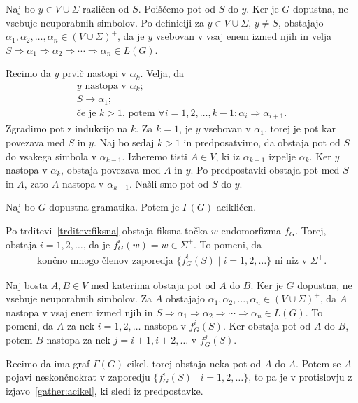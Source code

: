 \documentclass[fin1, tisk]{fmfdelo}
\theoremstyle{definition}
\begin{document}
\begin{dokaz}
    Naj bo $y \in V \cup \Sigma$ različen od $S$. Poiščemo pot od $S$ do $y$. Ker je $G$ dopustna,
    ne vsebuje neuporabnih simbolov. Po definiciji za $y \in V \cup \Sigma$, $ y \neq S$, obstajajo
    $\alpha_1, \alpha_2, \ldots, \alpha_n \in (V \cup \Sigma)^+$, da je $y$ vsebovan v vsaj
    enem izmed njih in velja $S \Rightarrow \alpha_1 \Rightarrow \alpha_2 \Rightarrow \cdots 
    \Rightarrow \alpha_n \in L(G)$.
    
    Recimo da $y$ prvič nastopi v $\alpha_k$. Velja, da
    \begin{gather*}
        y \text{ nastopa v } \alpha_k; \\
        S \rightarrow \alpha_1; \\
        \text{če je } k > 1 \text{, potem } \forall i = 1, 2, \ldots, k-1 \colon \alpha_i 
        \Rightarrow \alpha_{i+1}.
    \end{gather*}
    Zgradimo pot z indukcijo na $k$. Za $k=1$, je $y$ vsebovan v $\alpha_1$, torej je pot kar 
    povezava med $S$ in $y$. Naj bo sedaj $k>1$ in predposatvimo, da obstaja pot od $S$ do vsakega
    simbola v $\alpha_{k-1}$. Izberemo tisti $A \in V$, ki iz $\alpha_{k-1}$ izpelje $\alpha_k$.
    Ker $y$ nastopa v $\alpha_k$, obstaja povezava med $A$ in $y$. Po predpostavki obstaja pot
    med $S$ in $A$, zato $A$ nastopa v $\alpha_{k-1}$. Našli smo pot od $S$ do $y$.
\end{dokaz}

\begin{lema}\label{lema:acikličen}
    Naj bo $G$ dopustna gramatika. Potem je $\Gamma(G)$ acikličen.
\end{lema}

\begin{dokaz}
    Po trditevi~\ref{trditev:fiksna} obstaja fiksna točka $w$ endomorfizma $f_G$. Torej, obstaja
    $i = 1, 2, \ldots$, da je $f^i_G(w) = w \in \Sigma^+$. To pomeni, da 
    \begin{gather}\label{gather:acikel}
        \text{končno mnogo členov zaporedja } \{ f^i_G(S) \mid i = 1, 2, \ldots \} \text{ ni niz v }
        \Sigma^+.
    \end{gather}
    
    Naj bosta $A, B \in V$ med katerima obstaja pot od $A$ do $B$. Ker je $G$ dopustna, ne vsebuje
    neuporabnih simbolov. Za $A$ obstajajo $\alpha_1, \alpha_2, \ldots, \alpha_n \in (V \cup \Sigma)^+$,
    da $A$ nastopa v vsaj enem izmed njih in $S \Rightarrow \alpha_1 \Rightarrow 
    \alpha_2 \Rightarrow \cdots \Rightarrow \alpha_n \in L(G)$. To pomeni, da $A$ za nek 
    $i = 1, 2, \ldots$ nastopa v $f^i_G(S)$. Ker obstaja pot od $A$ do $B$, potem $B$ nastopa
    za nek $j = i+1, i+2, \ldots$ v $f^j_G(S)$.

    Recimo da ima graf $\Gamma(G)$ cikel, torej obstaja neka pot od $A$ do $A$. Potem se $A$
    pojavi neskončnokrat v zaporedju $\{ f^i_G(S) \mid i = 1, 2, \ldots \}$, to pa je v 
    protislovju z izjavo~\eqref{gather:acikel}, ki sledi iz predpostavke.
\end{dokaz}
\end{document}

